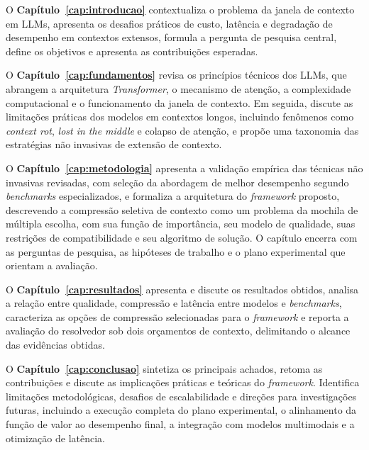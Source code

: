 O \textbf{Capítulo~\ref{cap:introducao}} contextualiza o problema da janela de contexto em LLMs, apresenta os desafios práticos de custo, latência e degradação de desempenho em contextos extensos, formula a pergunta de pesquisa central, define os objetivos e apresenta as contribuições esperadas.

O \textbf{Capítulo~\ref{cap:fundamentos}} revisa os princípios técnicos dos LLMs, que abrangem a arquitetura \textit{Transformer}, o mecanismo de atenção, a complexidade computacional e o funcionamento da janela de contexto. Em seguida, discute as limitações práticas dos modelos em contextos longos, incluindo fenômenos como \textit{context rot}, \textit{lost in the middle} e colapso de atenção, e propõe uma taxonomia das estratégias não invasivas de extensão de contexto.

O \textbf{Capítulo~\ref{cap:metodologia}} apresenta a validação empírica das técnicas não invasivas revisadas, com seleção da abordagem de melhor desempenho segundo \textit{benchmarks} especializados, e formaliza a arquitetura do \textit{framework} proposto, descrevendo a compressão seletiva de contexto como um problema da mochila de múltipla escolha, com sua função de importância, seu modelo de qualidade, suas restrições de compatibilidade e seu algoritmo de solução. O capítulo encerra com as perguntas de pesquisa, as hipóteses de trabalho e o plano experimental que orientam a avaliação.

O \textbf{Capítulo~\ref{cap:resultados}} apresenta e discute os resultados obtidos, analisa a relação entre qualidade, compressão e latência entre modelos e \textit{benchmarks}, caracteriza as opções de compressão selecionadas para o \textit{framework} e reporta a avaliação do resolvedor sob dois orçamentos de contexto, delimitando o alcance das evidências obtidas.

O \textbf{Capítulo~\ref{cap:conclusao}} sintetiza os principais achados, retoma as contribuições e discute as implicações práticas e teóricas do \textit{framework}. Identifica limitações metodológicas, desafios de escalabilidade e direções para investigações futuras, incluindo a execução completa do plano experimental, o alinhamento da função de valor ao desempenho final, a integração com modelos multimodais e a otimização de latência.
